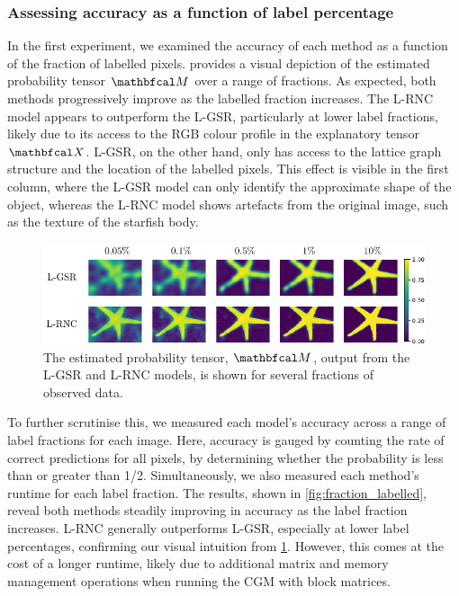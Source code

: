 \subsubsection{Assessing accuracy as a function of label percentage}

In the first experiment, we examined the accuracy of each method as a function of the fraction of labelled pixels.  provides a visual depiction of the estimated probability tensor $\Mt$ over a range of fractions. As expected, both methods progressively improve as the labelled fraction increases. The L-RNC model appears to outperform the L-GSR, particularly at lower label fractions, likely due to its access to the RGB colour profile in the explanatory tensor $\Xt$. L-GSR, on the other hand, only has access to the lattice graph structure and the location of the labelled pixels. This effect is visible in the first column, where the L-GSR model can only identify the approximate shape of the object, whereas the L-RNC model shows artefacts from the original image, such as the texture of the starfish body. 


\begin{figure}[t] 
    \begin{center}
        \includegraphics[width=\linewidth]{Figures/starfish.pdf}
    \end{center}
   \caption[Image segmentation output as a function of labelled pixel fraction]{The estimated probability tensor, $\Mt$, output from the L-GSR and L-RNC models, is shown for several fractions of observed data.} 
    \label{fig:starfish}
\end{figure}

To further scrutinise this, we measured each model's accuracy across a range of label fractions for each image. Here, accuracy is gauged by counting the rate of correct predictions for all pixels, by determining whether the probability is less than or greater than 1/2. Simultaneously, we also measured each method's runtime for each label fraction. The results, shown in \cref{fig:fraction_labelled}, reveal both methods steadily improving in accuracy as the label fraction increases. L-RNC generally outperforms L-GSR, especially at lower label percentages, confirming our visual intuition from \cref{fig:starfish}. However, this comes at the cost of a longer runtime, likely due to additional matrix and memory management operations when running the CGM with block matrices. 


